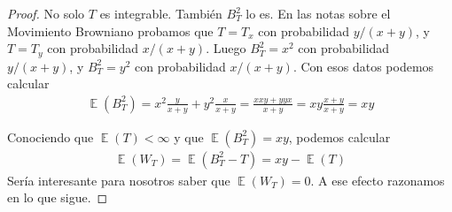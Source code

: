 \documentclass{article}
\DeclareMathOperator{\Expectation}{\mathbb{E}}
\newcommand{\brownian}{B}
\newcommand{\wiener}{W}
\theoremstyle{definition}
\begin{document}
\begin{proof}
No solo \(T\) es integrable.
También \(\brownian_T^2\) lo es.
En las notas sobre el Movimiento Browniano probamos que \(T = T_x\) con probabilidad \(y /(x + y)\), y \(T = T_y\) con probabilidad \(x / (x + y)\).
Luego \(B_T^2 = x^2\) con probabilidad \(y / (x + y)\), y \(B_T^2 = y^2\) con probabilidad \(x / (x + y)\).
Con esos datos podemos calcular
\begin{align}
	\Expectation(B_T^2)
	=
	x^2 \frac{y}{x + y} + y^2 \frac{x}{x + y}
	=
	\frac{x x y + y y x}{x + y}
	=
	xy \frac{x + y}{x + y}
	=
	xy
\end{align}

Conociendo que \(\Expectation(T) < \infty\) y que \(\Expectation(\brownian_T^2) = xy\), podemos calcular
\begin{align}
	\Expectation(\wiener_T)
	=
	\Expectation \left( B_T^2 - T \right)
	=
	x y - \Expectation(T)
\end{align}
Sería interesante para nosotros saber que \(\Expectation(\wiener_T) = 0\).
A ese efecto razonamos en lo que sigue.


\end{proof}
\end{document}
